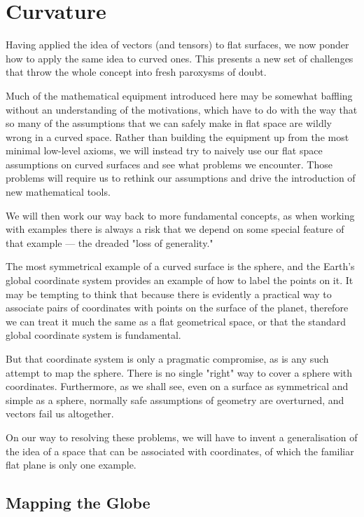 \chapter{Curvature} \label{ch:curvature}

Having applied the idea of vectors (and tensors) to flat surfaces, we now ponder how to apply the same idea to curved ones. This presents a new set of challenges that throw the whole concept into fresh paroxysms of doubt.

Much of the mathematical equipment introduced here may be somewhat baffling without an understanding of the motivations, which have to do with the way that so many of the assumptions that we can safely make in flat space are wildly wrong in a curved space. Rather than building the equipment up from the most minimal low-level axioms, we will instead try to naively use our flat space assumptions on curved surfaces and see what problems we encounter. Those problems will require us to rethink our assumptions and drive the introduction of new mathematical tools.

We will then work our way back to more fundamental concepts, as when working with examples there is always a risk that we depend on some special feature of that example --- the dreaded "loss of generality."

The most symmetrical example of a curved surface is the sphere, and the Earth's global coordinate system provides an example of how to label the points on it. It may be tempting to think that because there is evidently a practical way to associate pairs of coordinates with points on the surface of the planet, therefore we can treat it much the same as a flat geometrical space, or that the standard global coordinate system is fundamental.

But that coordinate system is only a pragmatic compromise, as is any such attempt to map the sphere. There is no single "right" way to cover a sphere with coordinates. Furthermore, as we shall see, even on a surface as symmetrical and simple as a sphere, normally safe assumptions of geometry are overturned, and vectors fail us altogether.

On our way to resolving these problems, we will have to invent a generalisation of the idea of a space that can be associated with coordinates, of which the familiar flat plane is only one example.

\section{Mapping the Globe}

